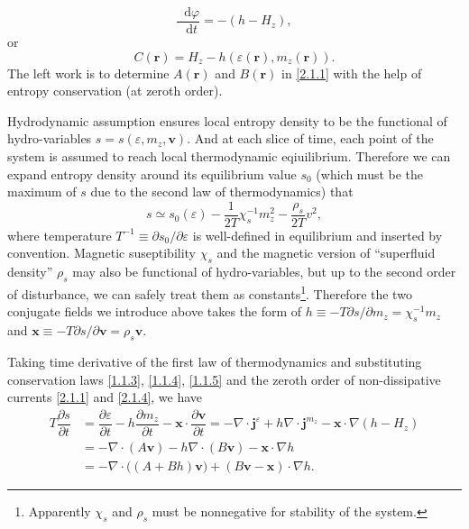 \documentclass[10pt,nofootinbib]{revtex4}
\newcommand*\dd{\mathop{}\!\mathrm{d}}
\begin{document}
			\begin{equation}\label{2.1.3}
				\dfrac{\dd\varphi}{\dd t}=-(h-H_z),
			\end{equation}
			or
			\begin{equation}\label{2.1.4}
				C(\bm{r})=H_z-h(\varepsilon(\bm{r}),m_z(\bm{r})).
			\end{equation}
			\indent The left work is to determine $A(\bm{r})$ and $B(\bm{r})$ in \eqref{2.1.1} with the help of entropy conservation (at zeroth order).\par
			Hydrodynamic assumption ensures local entropy density to be the functional of hydro-variables $s=s(\varepsilon,m_z,\bm{v})$. And at each slice of time, each point of the system is assumed to reach local thermodynamic eqiuilibrium. Therefore we can expand entropy density around its equilibrium value $s_0$ (which must be the maximum of $s$ due to the second law of thermodynamics) that 
			\begin{equation}\label{2.1.5}
				s\simeq s_0(\varepsilon)-\dfrac{1}{2T}\chi_s^{-1}m_z^2-\dfrac{\rho_s}{2T}v^2,
			\end{equation}
			where temperature $T^{-1}\equiv\partial s_0/\partial\varepsilon$ is well-defined in equilibrium and inserted by convention. Magnetic suseptibility $\chi_s$ and the magnetic version of ``superfluid density'' $\rho_s$ may also be functional of hydro-variables, but up to the second order of disturbance, we can safely treat them as constants\footnote{Apparently $\chi_s$ and $\rho_s$ must be nonnegative for stability of the system.}. Therefore the two conjugate fields we introduce above takes the form of $h\equiv-T \partial s/\partial m_z=\chi_s^{-1}m_z$ and $\bm{x}\equiv-T\partial s/\partial \bm{v}=\rho_s\bm{v}$.\par
			Taking time derivative of the first law of thermodynamics and substituting conservation laws \eqref{1.1.3}, \eqref{1.1.4}, \eqref{1.1.5} and the zeroth order of non-dissipative currents \eqref{2.1.1} and \eqref{2.1.4}, we have
			\begin{align}\label{2.1.6}
				T\dfrac{\partial s}{\partial t}&=\dfrac{\partial \varepsilon}{\partial t}-h\dfrac{\partial m_z}{\partial t}-\bm{x}\cdot\dfrac{\partial \bm{v}}{\partial t}=-\nabla\cdot\bm{j}^\varepsilon+h\nabla\cdot\bm{j}^{m_z}-\bm{x}\cdot\nabla(h-H_z)\nonumber\\
				&=-\nabla\cdot(A\bm{v})-h\nabla\cdot(B\bm{v})-\bm{x}\cdot\nabla h\nonumber\\
				&=-\nabla\cdot\bigg((A+Bh)\bm{v}\bigg)+(B\bm{v}-\bm{x})\cdot\nabla h.
			\end{align}
\end{document}
